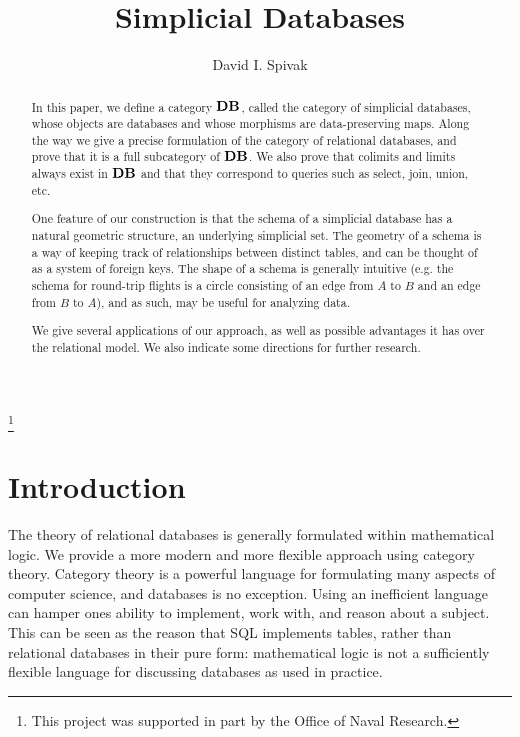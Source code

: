 \documentclass{amsart}
\def\Data{{\bf DB}}
\begin{document}
\author{David I. Spivak}

\thanks{This project was supported in part by the Office of Naval Research.}

\title{Simplicial Databases}

\maketitle

\begin{abstract}

In this paper, we define a category $\Data$, called the category of simplicial databases, whose objects are databases and whose morphisms are data-preserving maps.  Along the way we give a precise formulation of the category of relational databases, and prove that it is a full subcategory of $\Data$.  We also prove that colimits and limits always exist in $\Data$ and that they correspond to queries such as select, join, union, etc.

One feature of our construction is that the schema of a simplicial database has a natural geometric structure, an underlying simplicial set.  The geometry of a schema is a way of keeping track of relationships between distinct tables, and can be thought of as a system of foreign keys.  The shape of a schema is generally intuitive (e.g. the schema for round-trip flights is a circle consisting of an edge from $A$ to $B$ and an edge from $B$ to $A$), and as such, may be useful for analyzing data.

We give several applications of our approach, as well as possible advantages it has over the relational model.  We also indicate some directions for further research.

\end{abstract}

\setcounter{tocdepth}{1}

\tableofcontents


\section{Introduction}\label{sec:intro}


The theory of relational databases is generally formulated within mathematical logic.  We provide a more modern and more flexible approach using category theory.  Category theory is a powerful language for formulating many aspects of computer science, and databases is no exception.  Using an inefficient language can hamper ones ability to implement, work with, and reason about a subject.  This can be seen as the reason that SQL implements tables, rather than relational databases in their pure form: mathematical logic is not a sufficiently flexible language for discussing databases as used in practice.
\end{document}
